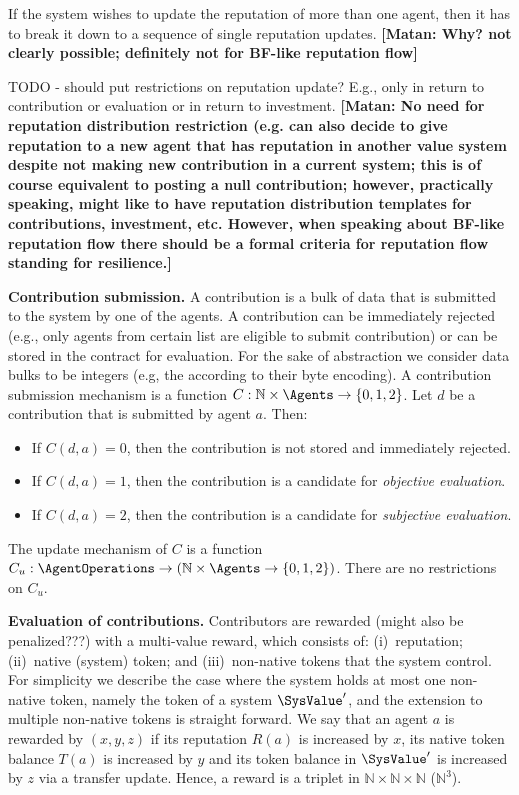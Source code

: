 \documentclass[10pt]{llncs}
\newcommand{\nat}{\mathbb{N}}
\newcommand{\MyComment}[1]{{\textbf{\color{blue} [Matan: #1]}}}
\begin{document}
If the system wishes to update the reputation of more than one agent, then it has to break it down to a sequence of single reputation updates. \MyComment{Why? not clearly possible; definitely not for BF-like reputation flow}


TODO - should put restrictions on reputation update? E.g., only in return to contribution or evaluation or in return to investment.  \MyComment{No need for reputation distribution restriction (e.g. can also decide to give reputation to a new agent that has reputation in another value system despite not making new contribution in a current system; this is of course equivalent to posting a null contribution; however, practically speaking, might like to have reputation distribution templates for contributions, investment, etc.  However, when speaking about BF-like reputation flow there should be a formal criteria for reputation flow standing for resilience.}


\noindent \textbf{Contribution submission.}
A contribution is a bulk of data that is submitted to the system by one of the agents.
A contribution can be immediately rejected (e.g., only agents from certain list are eligible to submit contribution) or can be stored in the contract for evaluation.
For the sake of abstraction we consider data bulks to be integers (e.g, the according to their byte encoding).
A contribution submission mechanism is a function $C: \nat \times \Agents \to \{0,1,2\}$.
Let $d$ be a contribution that is submitted by agent $a$.
Then:
\begin{itemize}
\item If $C(d,a) = 0$, then the contribution is not stored and immediately rejected.
\item If $C(d,a) = 1$, then the contribution is a candidate for \emph{objective evaluation}.
\item If $C(d,a) = 2$, then the contribution is a candidate for \emph{subjective evaluation}.
\end{itemize}
The update mechanism of $C$ is a function $C_u: \AgentOperations \to (\nat \times \Agents\to \{0,1,2\})$.
There are no restrictions on $C_u$.

\noindent \textbf{Evaluation of contributions.}
Contributors are rewarded (might also be penalized???) with a multi-value reward, which consists of:
(i)~reputation; (ii)~native (system) token; and (iii)~non-native tokens that the system control.
For simplicity we describe the case where the system holds at most one non-native token, namely the token of a system $\SysValue '$, and the extension to multiple non-native tokens is straight forward.
We say that an agent $a$ is rewarded by $(x,y,z)$ if its reputation $R(a)$ is increased by $x$, its native token balance $T(a)$ is increased by $y$ and its token balance in $\SysValue '$ is increased by $z$ via a transfer update.
Hence, a reward is a triplet in $\nat\times\nat\times\nat$ ($\nat ^ 3$).
\end{document}
